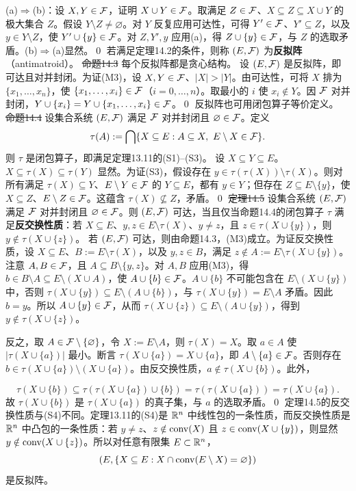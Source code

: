 \pr (a)$\Rightarrow$(b)：设 $X,Y\in\mathcal F$，证明 $X\cup Y\in\mathcal F$。取满足 $Z\in\mathcal F$、$X\subseteq Z\subseteq X\cup Y$ 的极大集合 $Z$。假设 $Y\setminus Z\ne\varnothing$。对 $Y$ 反复应用可达性，可得 $Y'\in\mathcal F$、$Y'\subseteq Z$，以及 $y\in Y\setminus Z$，使 $Y'\cup\{y\}\in\mathcal F$。对 $Z,Y',y$ 应用(a)，得 $Z\cup\{y\}\in\mathcal F$，与 $Z$ 的选取矛盾。(b)$\Rightarrow$(a)显然。\qed
若满足定理14.2的条件，则称 $(E,\mathcal F)$ 为\textbf{反拟阵}（antimatroid）。
\st{命题14.3} 每个反拟阵都是贪心结构。
\pr 设 $(E,\mathcal F)$ 是反拟阵，即可达且对并封闭。为证(M3)，设 $X,Y\in\mathcal F$、$|X|>|Y|$。由可达性，可将 $X$ 排为 $\{x_1,\ldots,x_n\}$，使 $\{x_1,\ldots,x_i\}\in\mathcal F$（$i=0,\ldots,n$）。取最小的 $i$ 使 $x_i\notin Y$。因 $\mathcal F$ 对并封闭，$Y\cup\{x_i\}=Y\cup\{x_1,\ldots,x_i\}\in\mathcal F$。\qed
反拟阵也可用闭包算子等价定义。
\st{命题14.4} 设集合系统 $(E,\mathcal F)$ 满足 $\mathcal F$ 对并封闭且 $\varnothing\in\mathcal F$。定义
\[\tau(A):=\bigcap\{X\subseteq E:A\subseteq X,\ E\setminus X\in\F\}.\]
则 $\tau$ 是闭包算子，即满足定理13.11的(S1)--(S3)。
\pr 设 $X\subseteq Y\subseteq E$。$X\subseteq\tau(X)\subseteq\tau(Y)$ 显然。为证(S3)，假设存在 $y\in\tau(\tau(X))\setminus\tau(X)$。则对所有满足 $\tau(X)\subseteq Y$、$E\setminus Y\in\mathcal F$ 的 $Y\subseteq E$，都有 $y\in Y$；但存在 $Z\subseteq E\setminus\{y\}$，使 $X\subseteq Z$、$E\setminus Z\in\mathcal F$。这蕴含 $\tau(X)\nsubseteq Z$，矛盾。\qed
\st{定理14.5} 设集合系统 $(E,\mathcal F)$ 满足 $\mathcal F$ 对并封闭且 $\varnothing\in\mathcal F$。则 $(E,\mathcal F)$ 可达，当且仅当命题14.4的闭包算子 $\tau$ 满足\textbf{反交换性质}：若 $X\subseteq E$、$y,z\in E\setminus\tau(X)$、$y\ne z$，且 $z\in\tau(X\cup\{y\})$，则 $y\notin\tau(X\cup\{z\})$。
\pr 若 $(E,\mathcal F)$ 可达，则由命题14.3，(M3)成立。为证反交换性质，设 $X\subseteq E$、$B:=E\setminus\tau(X)$，以及 $y,z\in B$，满足 $z\notin A:=E\setminus\tau(X\cup\{y\})$。注意 $A,B\in\mathcal F$，且 $A\subseteq B\setminus\{y,z\}$。对 $A,B$ 应用(M3)，得 $b\in B\setminus A\subseteq E\setminus(X\cup A)$，使 $A\cup\{b\}\in\mathcal F$。$A\cup\{b\}$ 不可能包含在 $E\setminus(X\cup\{y\})$ 中，否则 $\tau(X\cup\{y\})\subseteq E\setminus(A\cup\{b\})$，与 $\tau(X\cup\{y\})=E\setminus A$ 矛盾。因此 $b=y$。所以 $A\cup\{y\}\in\mathcal F$，从而 $\tau(X\cup\{z\})\subseteq E\setminus(A\cup\{y\})$，得到 $y\notin\tau(X\cup\{z\})$。

反之，取 $A\in\mathcal F\setminus\{\varnothing\}$，令 $X:=E\setminus A$，则 $\tau(X)=X$。取 $a\in A$ 使 $|\tau(X\cup\{a\})|$ 最小。断言 $\tau(X\cup\{a\})=X\cup\{a\}$，即 $A\setminus\{a\}\in\mathcal F$。否则存在 $b\in\tau(X\cup\{a\})\setminus(X\cup\{a\})$。由反交换性质，$a\notin\tau(X\cup\{b\})$。此外，

\[\tau(X\cup\{b\})\subseteq\tau(\tau(X\cup\{a\})\cup\{b\})
=\tau(\tau(X\cup\{a\}))=\tau(X\cup\{a\}).\]
故 $\tau(X\cup\{b\})$ 是 $\tau(X\cup\{a\})$ 的真子集，与 $a$ 的选取矛盾。\qed
定理14.5的反交换性质与(S4)不同。定理13.11的(S4)是 $\mathbb R^n$ 中线性包的一条性质，而反交换性质是 $\mathbb R^n$ 中凸包的一条性质：若 $y\ne z$、$z\notin\operatorname{conv}(X)$ 且 $z\in\operatorname{conv}(X\cup\{y\})$，则显然 $y\notin\operatorname{conv}(X\cup\{z\})$。所以对任意有限集 $E\subset\mathbb R^n$，
\[(E,\{X\subseteq E:X\cap\operatorname{conv}(E\setminus X)=\varnothing\})\]
是反拟阵。

